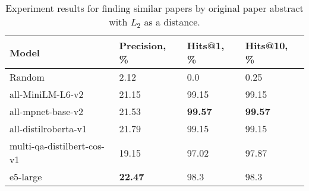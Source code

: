 \begin{table*}
    \small
    \centering
    \caption{Experiment results for finding similar papers by original paper abstract with \(L_{2}\) as a distance.}
    \bigskip
    \begin{tabularx}{0.99\textwidth}{XIII}

        \toprule

        \bfseries Model & \bfseries Precision, \% & \bfseries Hits@1, \% & \bfseries Hits@10, \% \\

        \midrule
        
        Random		                & 2.12  &  0.0 	&    0.25 \\
        
        \midrule
        
        all-MiniLM-L6-v2	        & 21.15 & 99.15	   &	99.15 \\
        all-mpnet-base-v2	        & 21.53 & \bfseries 99.57 &	\bfseries 99.57 \\
        all-distilroberta-v1	    & 21.79 & 99.15	   &	99.15 \\
        multi-qa-distilbert-cos-v1	& 19.15 & 97.02	   &	97.87 \\
        e5-large	                & \bfseries 22.47 & 98.3 	   &	98.3 \\

        \bottomrule

    \end{tabularx}

    \label{tab:experiments:abs-l2}
\end{table*}

